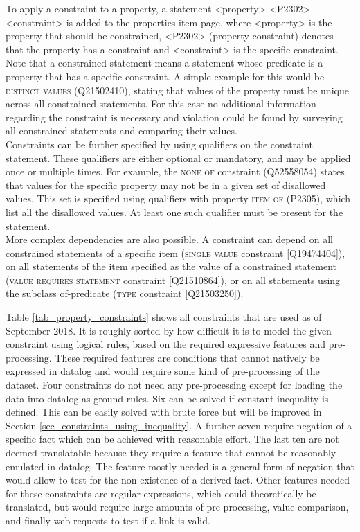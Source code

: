 \documentclass[hyperref,bachelorofscience,fleqn]{cgvpub}
\begin{document}
To apply a constraint to a property, a statement <property> <P2302> <constraint> is added to the properties item page, where <property> is the property that should be constrained, <P2302> (property constraint) denotes that the property has a constraint and <constraint> is the specific constraint. Note that a constrained statement means a statement whose predicate is a property that has a specific constraint. A simple example for this would be \textsc{distinct values} (Q21502410), stating that values of the property must be unique across all constrained statements. For this case no additional information regarding the constraint is necessary and violation could be found by surveying all constrained statements and comparing their values.\\
Constraints can be further specified by using qualifiers on the constraint statement. These qualifiers are either optional or mandatory, and may be applied once or multiple times. For example, the \textsc{none of} constraint (Q52558054) states that values for the specific property may not be in a given set of disallowed values. This set is specified using qualifiers with property \textsc{item of} (P2305), which list all the disallowed values. At least one such qualifier must be present for the statement.\\
More complex dependencies are also possible. A constraint can depend on all constrained statements of a specific item (\textsc{single value} constraint [Q19474404]), on all statements of the item specified as the value of a constrained statement (\textsc{value requires statement} constraint [Q21510864]), or on all statements using the subclass of-predicate (\textsc{type} constraint [Q21503250]).

Table \ref{tab_property_constraints} shows all constraints that are used as of September 2018. It is roughly sorted by how difficult it is to model the given constraint using logical rules, based on the required expressive features and pre-processing. These required features are conditions that cannot natively be expressed in datalog and would require some kind of pre-processing of the dataset. Four constraints do not need any pre-processing except for loading the data into datalog as ground rules. Six can be solved if constant inequality is defined. This can be easily solved with brute force but will be improved in Section \ref{sec_constraints_using_inequality}. A further seven require negation of a specific fact which can be achieved with reasonable effort. The last ten are not deemed translatable because they require a feature that cannot be reasonably emulated in datalog. The feature mostly needed is a general form of negation that would allow to test for the non-existence of a derived fact. Other features needed for these constraints are regular expressions, which could theoretically be translated, but would require large amounts of pre-processing, value comparison, and finally web requests to test if a link is valid.
\end{document}
